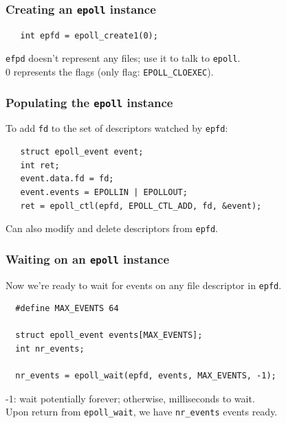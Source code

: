 \begin{frame}[fragile]
  \frametitle{Creating an {\tt epoll} instance}
  
    \begin{minipage}{.5\textwidth}
    \begin{lstlisting}
   int epfd = epoll_create1(0);
    \end{lstlisting}
    \end{minipage}

    {\tt efpd} doesn't represent any files; use it to talk to {\tt epoll}.\\[1em]

    0 represents the flags (only flag: {\tt EPOLL\_CLOEXEC}).
    
  
\end{frame}

\begin{frame}[fragile]
  \frametitle{Populating the {\tt epoll} instance}
  
    To add {\tt fd} to the set of descriptors watched by {\tt epfd}:
    \begin{lstlisting}
   struct epoll_event event;
   int ret;
   event.data.fd = fd;
   event.events = EPOLLIN | EPOLLOUT;
   ret = epoll_ctl(epfd, EPOLL_CTL_ADD, fd, &event);
    \end{lstlisting}

    Can also modify and delete descriptors from {\tt epfd}.
  
\end{frame}

\begin{frame}[fragile]
  \frametitle{Waiting on an {\tt epoll} instance}
  
    Now we're ready to wait for events on any file descriptor in {\tt epfd}.
    \begin{lstlisting}
  #define MAX_EVENTS 64

  struct epoll_event events[MAX_EVENTS];
  int nr_events;

  nr_events = epoll_wait(epfd, events, MAX_EVENTS, -1);
    \end{lstlisting}

-1: wait potentially forever; otherwise, milliseconds to wait.\\[1em]

Upon return from {\tt epoll\_wait}, we have {\tt nr\_events} events ready.

  
\end{frame}

